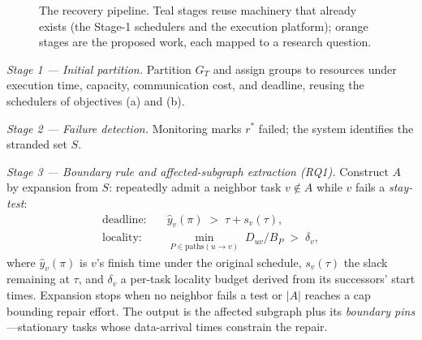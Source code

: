 \documentclass[11pt]{article}
\begin{document}
\begin{figure}[t]
\centering
{}
\caption{The recovery pipeline. Teal stages reuse machinery that
already exists (the Stage-1 schedulers and the execution
platform); orange stages are the proposed work, each mapped to a
research question.}
\label{fig:pipeline}
\end{figure}

\emph{Stage 1 --- Initial partition.} Partition $G_T$ and assign
groups to resources under execution time, capacity,
communication cost, and deadline, reusing the schedulers of
objectives (a) and (b).

\emph{Stage 2 --- Failure detection.} Monitoring marks $r^{*}$
failed; the system identifies the stranded set $S$.

\emph{Stage 3 --- Boundary rule and affected-subgraph extraction
(RQ1).} Construct $A$ by expansion from $S$: repeatedly admit a
neighbor task $v\notin A$ while $v$ fails a \emph{stay-test}:
\begin{align}
\text{deadline:}\quad & \hat{y}_v(\pi) \;>\; \tau + s_v(\tau),
\label{eq:stay-dl}\\
\text{locality:}\quad & \min_{P \in \mathrm{paths}(u \to v)}
\; D_{uv}/B_P \;>\; \delta_v,
\label{eq:stay-loc}
\end{align}
where $\hat{y}_v(\pi)$ is $v$'s finish time under the original
schedule, $s_v(\tau)$ the slack remaining at $\tau$, and
$\delta_v$ a per-task locality budget derived from its
successors' start times. Expansion stops when no neighbor fails
a test or $|A|$ reaches a cap bounding repair effort. The
output is the affected subgraph plus its \emph{boundary
pins}---stationary tasks whose data-arrival times constrain the
repair.
\end{document}
